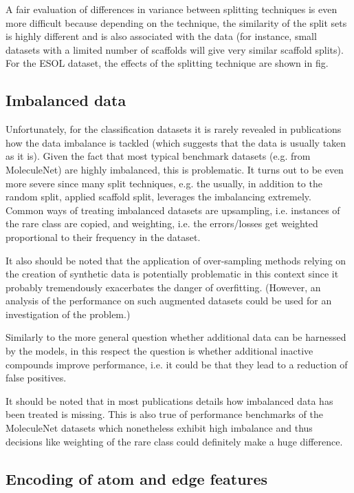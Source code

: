 A fair evaluation of differences in variance between splitting techniques is even more difficult because depending on the technique, the similarity of the split sets is highly different and is also associated with the data (for instance, small datasets with a limited number of scaffolds will give very similar scaffold splits).
For the ESOL dataset, the effects of the splitting technique are shown in fig.

\subsection{Imbalanced data}


Unfortunately, for the classification datasets it is rarely revealed in publications how the data imbalance is tackled (which suggests that the data is usually taken as it is). Given the fact that most typical benchmark datasets (e.g. from MoleculeNet) are highly imbalanced, this is problematic. It turns out to be even more severe since many split techniques, e.g. the usually, in addition to the random split, applied scaffold split, leverages the imbalancing extremely.
Common ways of treating imbalanced datasets are upsampling, i.e. instances of the rare class are copied, and weighting, i.e. the errors/losses get weighted proportional to their frequency in the dataset.

It also should be noted that the application of over-sampling methods relying on the creation of synthetic data is potentially problematic in this context since it probably tremendously exacerbates the danger of overfitting. (However, an analysis of the performance on such augmented datasets could be used for an investigation of the problem.)

Similarly to the more general question whether additional data can be harnessed by the models, in this respect the question is whether additional inactive compounds improve performance, i.e. it could be that they  lead to a reduction of false positives.

It should be noted that in most publications details how imbalanced data has been treated is missing. This is also true of performance benchmarks of the MoleculeNet datasets which nonetheless exhibit high imbalance and thus decisions like weighting of the rare class could definitely make a huge difference.


\subsection{Encoding of atom and edge features}


